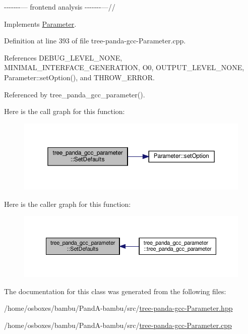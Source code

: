 -\/-\/-\/-\/-\/-\/-\/--- frontend analysis -\/-\/-\/-\/-\/-\/-\/---// 

Implements \hyperlink{classParameter_af2bbff2bbfee25d348bd2f0d796d7b3f}{Parameter}.



Definition at line 393 of file tree-\/panda-\/gcc-\/\+Parameter.\+cpp.



References D\+E\+B\+U\+G\+\_\+\+L\+E\+V\+E\+L\+\_\+\+N\+O\+NE, M\+I\+N\+I\+M\+A\+L\+\_\+\+I\+N\+T\+E\+R\+F\+A\+C\+E\+\_\+\+G\+E\+N\+E\+R\+A\+T\+I\+ON, O0, O\+U\+T\+P\+U\+T\+\_\+\+L\+E\+V\+E\+L\+\_\+\+N\+O\+NE, Parameter\+::set\+Option(), and T\+H\+R\+O\+W\+\_\+\+E\+R\+R\+OR.



Referenced by tree\+\_\+panda\+\_\+gcc\+\_\+parameter().

Here is the call graph for this function\+:
\nopagebreak
\begin{figure}[H]
\begin{center}
\leavevmode
\includegraphics[width=350pt]{da/df6/classtree__panda__gcc__parameter_a2064bc94ae2751a0e420a60e2024fcbc_cgraph}
\end{center}
\end{figure}
Here is the caller graph for this function\+:
\nopagebreak
\begin{figure}[H]
\begin{center}
\leavevmode
\includegraphics[width=350pt]{da/df6/classtree__panda__gcc__parameter_a2064bc94ae2751a0e420a60e2024fcbc_icgraph}
\end{center}
\end{figure}


The documentation for this class was generated from the following files\+:\begin{DoxyCompactItemize}
\item 
/home/osboxes/bambu/\+Pand\+A-\/bambu/src/\hyperlink{tree-panda-gcc-Parameter_8hpp}{tree-\/panda-\/gcc-\/\+Parameter.\+hpp}\item 
/home/osboxes/bambu/\+Pand\+A-\/bambu/src/\hyperlink{tree-panda-gcc-Parameter_8cpp}{tree-\/panda-\/gcc-\/\+Parameter.\+cpp}\end{DoxyCompactItemize}
